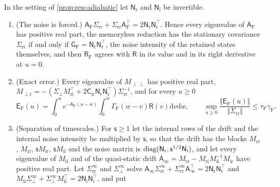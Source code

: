 \begin{proposition}\label{prop:ren-adiabatic-rate}
In the setting of \cref{prop:ren-adiabatic} let $\mathsf N_{\mathrm r}$ and $\mathsf N_{\mathrm i}$ be invertible.
\begin{enumerate}
\item[(a)] (The noise is forced.) $\mathsf A_{\mathrm F}\Sigma_{\mathrm{rr}}+\Sigma_{\mathrm{rr}}\mathsf A_{\mathrm F}^\top=2\mathsf N_{\mathrm r}\mathsf N_{\mathrm r}^\top$. Hence every eigenvalue of $\mathsf A_{\mathrm F}$ has positive real part, the memoryless reduction has the stationary covariance $\Sigma_{\mathrm{rr}}$ if and only if $\mathsf G_{\mathrm F}=\mathsf N_{\mathrm r}\mathsf N_{\mathrm r}^\top$, the noise intensity of the retained states themselves, and then $\mathsf R_{\mathrm F}$ agrees with $\mathsf R$ in its value and in its right derivative at $u=0$.
\item[(b)] (Exact error.) Every eigenvalue of $M_{\perp\perp}$ has positive real part, $M_{\perp\mathrm r}=-(\Sigma_\perp M_{\mathrm{ri}}^\top+2\mathsf C_{\mathrm{ir}}\mathsf N_{\mathrm r}\mathsf N_{\mathrm r}^\top)\Sigma_{\mathrm{rr}}^{-1}$, and for every $u\ge0$
\begin{equation}\label{eq:ren-adiabatic-error}
\mathsf E_{\mathrm F}(u)=\int_0^ue^{-\mathsf A_{\mathrm F}(u-w)}\int_0^w\Gamma_{\mathrm F}(w-v)\mathsf R(v)\mathrm dv\mathrm dw,\qquad\sup_{u\ge0}\frac{\Vert\mathsf E_{\mathrm F}(u)\Vert}{\Vert\Sigma_{\mathrm{rr}}\Vert}\le\tau_{\mathrm F}\gamma_{\mathrm F}.
\end{equation}
\item[(c)] (Separation of timescales.) For $\mathsf s\ge1$ let the internal rows of the drift and the internal noise intensity be multiplied by $\mathsf s$, so that the drift has the blocks $M_{\mathrm{rr}}$, $M_{\mathrm{ri}}$, $\mathsf sM_{\mathrm{ir}}$, $\mathsf sM_{\mathrm{ii}}$ and the noise matrix is $\operatorname{diag}(\mathsf N_{\mathrm r},\mathsf s^{1/2}\mathsf N_{\mathrm i})$, and let every eigenvalue of $M_{\mathrm{ii}}$ and of the quasi-static drift $\mathsf A_\infty=M_{\mathrm{rr}}-M_{\mathrm{ri}}M_{\mathrm{ii}}^{-1}M_{\mathrm{ir}}$ have positive real part. Let $\Sigma^\infty_{\mathrm{rr}}$ and $\Sigma^\infty_\perp$ solve $\mathsf A_\infty\Sigma^\infty_{\mathrm{rr}}+\Sigma^\infty_{\mathrm{rr}}\mathsf A_\infty^\top=2\mathsf N_{\mathrm r}\mathsf N_{\mathrm r}^\top$ and $M_{\mathrm{ii}}\Sigma^\infty_\perp+\Sigma^\infty_\perp M_{\mathrm{ii}}^\top=2\mathsf N_{\mathrm i}\mathsf N_{\mathrm i}^\top$, and put
\begin{equation}\label{eq:ren-adiabatic-first}

\end{equation}
\end{enumerate}
\end{proposition}
